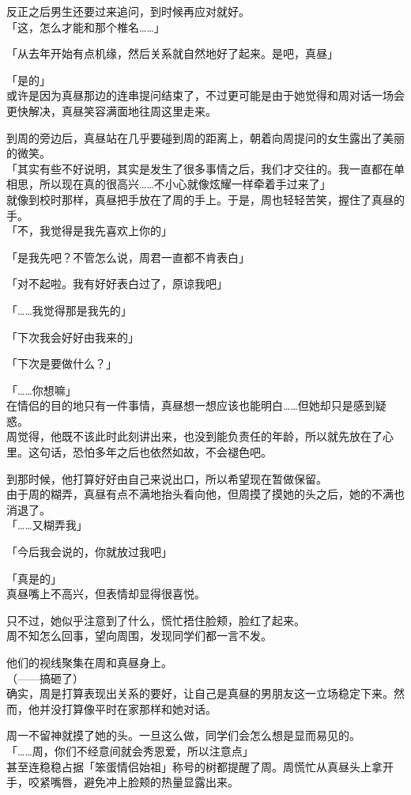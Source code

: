 反正之后男生还要过来追问，到时候再应对就好。\\

「这，怎么才能和那个椎名……」

「从去年开始有点机缘，然后关系就自然地好了起来。是吧，真昼」

「是的」\\

或许是因为真昼那边的连串提问结束了，不过更可能是由于她觉得和周对话一场会更快解决，真昼笑容满面地往周这里走来。

到周的旁边后，真昼站在几乎要碰到周的距离上，朝着向周提问的女生露出了美丽的微笑。\\

「其实有些不好说明，其实是发生了很多事情之后，我们才交往的。我一直都在单相思，所以现在真的很高兴……不小心就像炫耀一样牵着手过来了」\\

就像到校时那样，真昼把手放在了周的手上。于是，周也轻轻苦笑，握住了真昼的手。\\

「不，我觉得是我先喜欢上你的」

「是我先吧？不管怎么说，周君一直都不肯表白」

「对不起啦。我有好好表白过了，原谅我吧」

「……我觉得那是我先的」

「下次我会好好由我来的」

「下次是要做什么？」

「……你想嘛」\\

在情侣的目的地只有一件事情，真昼想一想应该也能明白……但她却只是感到疑惑。\\

周觉得，他既不该此时此刻讲出来，也没到能负责任的年龄，所以就先放在了心里。这句话，恐怕多年之后也依然如故，不会褪色吧。

到那时候，他打算好好由自己来说出口，所以希望现在暂做保留。\\

由于周的糊弄，真昼有点不满地抬头看向他，但周摸了摸她的头之后，她的不满也消退了。\\

「……又糊弄我」

「今后我会说的，你就放过我吧」

「真是的」\\

真昼嘴上不高兴，但表情却显得很喜悦。

只不过，她似乎注意到了什么，慌忙捂住脸颊，脸红了起来。\\

周不知怎么回事，望向周围，发现同学们都一言不发。

他们的视线聚集在周和真昼身上。\\

（——搞砸了）\\

确实，周是打算表现出关系的要好，让自己是真昼的男朋友这一立场稳定下来。然而，他并没打算像平时在家那样和她对话。

周一不留神就摸了她的头。一旦这么做，同学们会怎么想是显而易见的。\\

「……周，你们不经意间就会秀恩爱，所以注意点」\\

甚至连稳稳占据「笨蛋情侣始祖」称号的树都提醒了周。周慌忙从真昼头上拿开手，咬紧嘴唇，避免冲上脸颊的热量显露出来。
